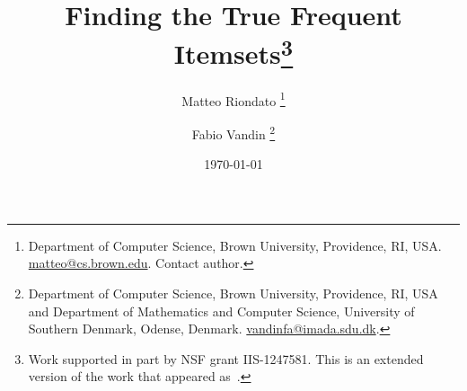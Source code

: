 \documentclass[twoside]{article}
\begin{document}
\title{Finding the True Frequent Itemsets\thanks{Work supported in part by NSF
grant IIS-1247581.
 This is an extended version of the work that appeared
as~\citep{RiondatoV14}.
}
}
\author{Matteo Riondato
\thanks{Department of Computer Science, Brown University, Providence, RI, USA.
\url{matteo@cs.brown.edu}. Contact author.}
\and Fabio Vandin
\thanks{Department of Computer Science, Brown University, Providence, RI, USA
and Department of Mathematics and Computer Science, University of Southern
Denmark, Odense, Denmark. \url{vandinfa@imada.sdu.dk}.}
}

\date{\today}

\maketitle







%




%
%

%



\end{document}
